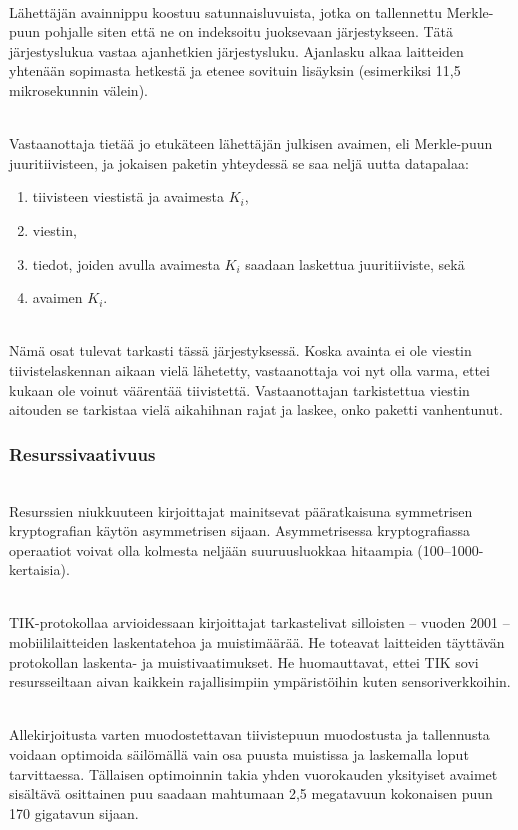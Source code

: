 \documentclass[finnish]{tktltiki2}
\theoremstyle{definition}
\theoremstyle{remark}
\begin{document}
\noindent \\
Lähettäjän avainnippu koostuu satunnaisluvuista, jotka on tallennettu Merkle-puun pohjalle siten että ne on indeksoitu juoksevaan järjestykseen. Tätä järjestyslukua vastaa ajanhetkien järjestysluku. Ajanlasku alkaa laitteiden yhtenään sopimasta hetkestä ja etenee sovituin lisäyksin (esimerkiksi 11,5 mikrosekunnin välein). 

\noindent \\
Vastaanottaja tietää jo etukäteen lähettäjän julkisen avaimen, eli Merkle-puun juuritiivisteen, ja jokaisen paketin yhteydessä se saa neljä uutta datapalaa:

\begin{enumerate}
\item tiivisteen viestistä ja avaimesta $K_i$,
\item viestin,
\item tiedot, joiden avulla avaimesta $K_i$ saadaan laskettua juuritiiviste, sekä
\item avaimen $K_i$.
\end{enumerate}

\noindent \\
Nämä osat tulevat tarkasti tässä järjestyksessä. Koska avainta ei ole viestin tiivistelaskennan aikaan vielä lähetetty, vastaanottaja voi nyt olla varma, ettei kukaan ole voinut väärentää tiivistettä. Vastaanottajan tarkistettua viestin aitouden se tarkistaa vielä aikahihnan rajat ja laskee, onko paketti vanhentunut.

\subsubsection{Resurssivaativuus} 
\noindent \\
Resurssien niukkuuteen kirjoittajat mainitsevat pääratkaisuna symmetrisen kryptografian käytön asymmetrisen sijaan. Asymmetrisessa kryptografiassa operaatiot voivat olla kolmesta neljään suuruusluokkaa hitaampia (100--1000-kertaisia).

\noindent \\
TIK-protokollaa arvioidessaan kirjoittajat tarkastelivat silloisten -- vuoden 2001 -- mobiililaitteiden laskentatehoa ja muistimäärää. He toteavat laitteiden täyttävän protokollan laskenta- ja muistivaatimukset. He huomauttavat, ettei TIK sovi resursseiltaan aivan kaikkein rajallisimpiin ympäristöihin kuten sensoriverkkoihin.

\noindent \\
Allekirjoitusta varten muodostettavan tiivistepuun muodostusta ja tallennusta voidaan optimoida säilömällä vain osa puusta muistissa ja laskemalla loput tarvittaessa. Tällaisen optimoinnin takia yhden vuorokauden yksityiset avaimet sisältävä osittainen puu saadaan mahtumaan 2,5 megatavuun kokonaisen puun 170 gigatavun sijaan.
\end{document}
